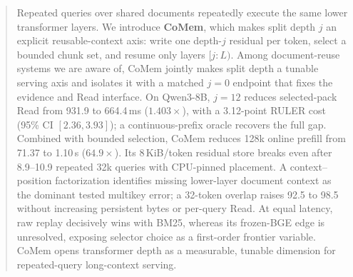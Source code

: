 \begin{abstract}
Repeated queries over shared documents repeatedly execute the same lower
transformer layers. We introduce \textbf{CoMem}, which makes split depth $j$ an
explicit reusable-context axis: write one depth-$j$ residual per token, select a
bounded chunk set, and resume only layers $[j{:}L)$. Among document-reuse systems we are aware of, CoMem jointly makes split depth a
tunable serving axis and isolates it with a matched $j{=}0$ endpoint that fixes
the evidence and Read interface. On Qwen3-8B, $j{=}12$ reduces selected-pack
Read from 931.9 to 664.4\,ms ($1.403\times$), with a 3.12-point RULER cost
(95\% CI $[2.36,3.93]$); a continuous-prefix oracle recovers the full gap.
Combined with bounded selection, CoMem reduces 128k online prefill from 71.37
to 1.10\,s ($64.9\times$). Its 8\,KiB/token residual store breaks even after
8.9--10.9 repeated 32k queries with CPU-pinned placement. A context--position
factorization identifies missing lower-layer document context as the dominant
tested multikey error; a 32-token overlap raises 92.5 to 98.5 without increasing
persistent bytes or per-query Read. At equal latency, raw replay decisively wins
with BM25, whereas its frozen-BGE edge is unresolved, exposing selector choice
as a first-order frontier variable. CoMem opens transformer depth as a
measurable, tunable dimension for repeated-query long-context serving.
\end{abstract}
